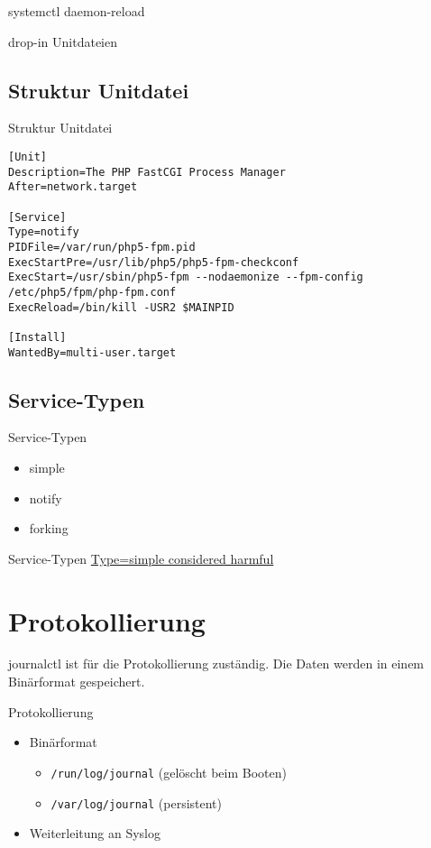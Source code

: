  systemctl daemon-reload

 drop-in Unitdateien
 \subsection{Struktur Unitdatei}

\begin{frame}[fragile]{Struktur Unitdatei}
 \begin{lstlisting}
[Unit]
Description=The PHP FastCGI Process Manager
After=network.target

[Service]
Type=notify
PIDFile=/var/run/php5-fpm.pid
ExecStartPre=/usr/lib/php5/php5-fpm-checkconf
ExecStart=/usr/sbin/php5-fpm --nodaemonize --fpm-config /etc/php5/fpm/php-fpm.conf
ExecReload=/bin/kill -USR2 $MAINPID

[Install]
WantedBy=multi-user.target
\end{lstlisting}
\end{frame}

\subsection{Service-Typen}

\begin{frame}{Service-Typen}
\begin{itemize}
\item simple
\item notify
\item forking
\end{itemize}
\end{frame}

\begin{frame}{Service-Typen}
\href{https://www.lucas-nussbaum.net/blog/?p=877}{Type=simple considered harmful}
\end{frame}

\section{Protokollierung}

journalctl ist für die Protokollierung zuständig. Die Daten werden in einem Binärformat gespeichert.

\begin{frame}[fragile]{Protokollierung}
\begin{itemize}
\item Binärformat
\begin{itemize}
\item \verb|/run/log/journal| (gelöscht beim Booten)
\item \verb|/var/log/journal| (persistent)
\end{itemize}
\item Weiterleitung an Syslog
\end{itemize}
\end{frame}

